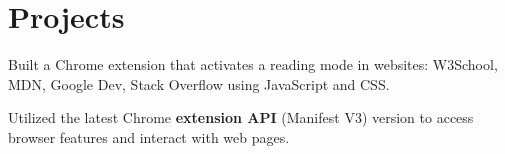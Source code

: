 \documentclass[]{DavidPietrocola-resume}
\begin{document}
\begin{minipage}[t]{0.62\textwidth}

\section{Projects}


\begin{tightemize}
\item Built a Chrome extension that activates a reading mode in websites: W3School, MDN, Google Dev, Stack Overflow using JavaScript and CSS.
\item Utilized the latest Chrome {\bf extension API} (Manifest V3) version to access browser features and interact with web pages.
\end{tightemize}
\sectionsep



\end{minipage}
\end{document}
